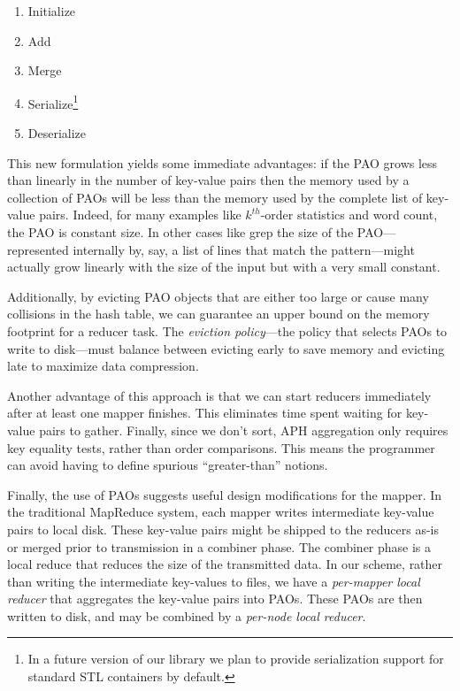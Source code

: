 \documentclass[10pt,letter,final,article,twocolumn]{article} %
\begin{document}
\begin{enumerate}
  \setlength{\itemsep}{1pt}
  \setlength{\parskip}{0pt}
  \setlength{\parsep}{0pt}
\item {Initialize}
\item {Add}
\item {Merge}
\item {Serialize}\footnote{In a future version of our library we plan to provide serialization support for standard STL containers by default.}
\item {Deserialize}
\end{enumerate}

This new formulation yields some immediate advantages: if the PAO grows less than linearly in the number of key-value pairs then the memory used by a collection of PAOs will be less than the memory used by the complete list of key-value pairs. Indeed, for many examples like $k^{th}$-order statistics and word count, the PAO is constant size. In other cases like grep the size of the PAO---represented internally by, say, a list of lines that match the pattern---might actually grow linearly with the size of the input but with a very small constant.

Additionally, by evicting PAO objects that are either too large or cause many collisions in the hash table, we can guarantee an upper bound on the memory footprint for a reducer task. The \emph{eviction policy}---the policy that selects PAOs to write to disk---must balance between evicting early to save memory and evicting late to maximize data compression.  

Another advantage of this approach is that we can start reducers immediately after at least one mapper finishes. This eliminates time spent waiting for key-value pairs to gather. Finally, since we don't sort, APH aggregation only requires key equality tests, rather than order comparisons. This means the programmer can avoid having to define spurious ``greater-than'' notions.

Finally, the use of PAOs suggests useful design modifications for the mapper. In the traditional MapReduce system, each mapper writes intermediate key-value pairs to local disk. These key-value pairs might be shipped to the reducers as-is or merged prior to transmission in a combiner phase. The combiner phase is a local reduce that reduces the size of the transmitted data. In our scheme, rather than writing the intermediate key-values to files, we have a \emph{per-mapper local reducer} that aggregates the key-value pairs into PAOs. These PAOs are then written to disk, and may be combined by a \emph{per-node local reducer}.
\end{document}
